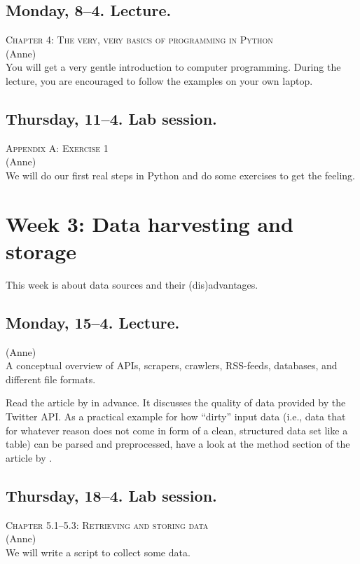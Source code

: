 \subsection*{Monday, 8--4. Lecture.}
\textsc{ Chapter 4: The very, very basics of programming in Python}\\
{\footnotesize{(Anne)}\\}
You will get a very gentle introduction to computer programming. During the lecture, you are encouraged to follow the examples on your own laptop.

\subsection*{Thursday, 11--4. Lab session.}
\textsc{ Appendix A: Exercise 1}\\
{\footnotesize{(Anne)}\\}
We will do our first real steps in Python and do some exercises to get the feeling. 


\section*{Week 3: Data harvesting and storage}
This week is about data sources and their (dis)advantages. 

\subsection*{Monday, 15--4. Lecture.}
{\footnotesize{(Anne)}\\}
A conceptual overview of APIs, scrapers, crawlers, RSS-feeds, databases, and different file formats.

Read the article by \cite{Morstatter2013} in advance. It discusses the quality of data provided by the Twitter API. As a practical example for how ``dirty'' input data (i.e., data that for whatever reason does not come in form of a clean, structured data set like a table) can be parsed and preprocessed, have a look at the method section of the article by \cite{Lewis2013}. 


\subsection*{Thursday, 18--4. Lab session.}
\textsc{ Chapter 5.1--5.3: Retrieving and storing data}\\
{\footnotesize{(Anne)}\\}
We will write a script to collect some data. 

